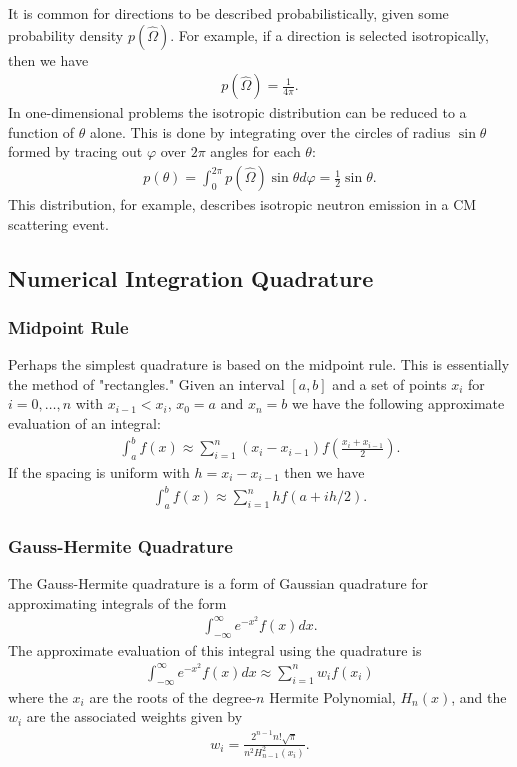\documentclass[11pt]{article}
\begin{document}
It is common for directions to be described probabilistically, given some probability density \(p\left(\hat{\Omega}\right)\).  For example, if a direction is selected isotropically, then we have
\begin{align}
  p\left(\hat{\Omega}\right) = \frac{1}{4\pi}.
\end{align}
In one-dimensional problems the isotropic distribution can be reduced to a function of \(\theta\) alone.  This is done by integrating over the circles of radius \(\sin\theta\) formed by tracing out \(\varphi\) over \(2\pi\) angles for each \(\theta\):
\begin{align}
  p(\theta) = \int_0^{2\pi} p\left(\hat{\Omega}\right) \sin\theta d\varphi
            = \frac{1}{2} \sin\theta.
\end{align}
This distribution, for example, describes isotropic neutron emission in a CM scattering event.

\subsection{Numerical Integration Quadrature}
\label{sec:orgheadline55}
\subsubsection{Midpoint Rule}
\label{sec:orgheadline53}
Perhaps the simplest quadrature is based on the midpoint rule.  This is essentially the method of "rectangles."  Given an interval \([a,b]\) and a set of points \(x_i\) for \(i=0,\hdots,n\) with \(x_{i-1} < x_i\), \(x_0 = a\) and \(x_n = b\) we have the following approximate evaluation of an integral:
\begin{align}
  \int_a^b f(x) \approx \sum_{i=1}^n \left( x_i - x_{i-1} \right) f\left(\frac{x_i+x_{i-1}}{2}\right).
\end{align}
If the spacing is uniform with \(h = x_i - x_{i-1}\) then we have
\begin{align}
  \int_a^b f(x) \approx \sum_{i=1}^n h f\left(a + ih/2\right).
\end{align}
\subsubsection{Gauss-Hermite Quadrature}
\label{sec:orgheadline54}
The Gauss-Hermite quadrature is a form of Gaussian quadrature for approximating integrals of the form
\begin{align}
  \int_{-\infty}^\infty e^{-x^2} f(x) dx.
\end{align}
The approximate evaluation of this integral using the quadrature is
\begin{align}
  \int_{-\infty}^\infty e^{-x^2} f(x) dx \approx \sum_{i=1}^n w_i f(x_i)
\end{align}
where the \(x_i\) are the roots of the degree-\(n\) Hermite Polynomial, \(H_n(x)\), and the \(w_i\) are the associated weights given by
\begin{align}
  w_i = \frac{2^{n-1} n! \sqrt{\pi}}{n^2 H_{n-1}^2(x_i)}.
\end{align}
\end{document}

